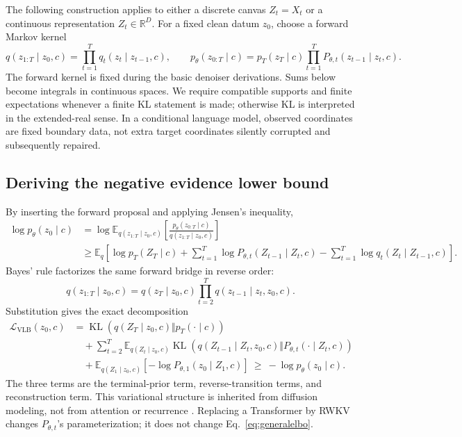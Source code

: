 \documentclass{article}
\theoremstyle{remark}\newtheorem{remark}[theorem]{Remark}
\newcommand{\R}{\mathbb R}
\newcommand{\E}{\mathbb E}
\newcommand{\KL}{\operatorname{KL}}
\begin{document}
The following construction applies to either a discrete canvas $Z_t=X_t$ or a continuous representation $Z_t\in\R^D$. For a fixed clean datum $z_0$, choose a forward Markov kernel
\begin{equation}
 q(z_{1:T}\mid z_0,c)=\prod_{t=1}^T q_t(z_t\mid z_{t-1},c),
 \qquad
 p_\theta(z_{0:T}\mid c)=p_T(z_T\mid c)\prod_{t=1}^T P_{\theta,t}(z_{t-1}\mid z_t,c).
 \label{eq:commonpath}
\end{equation}
The forward kernel is fixed during the basic denoiser derivations. Sums below become integrals in continuous spaces. We require compatible supports and finite expectations whenever a finite KL statement is made; otherwise KL is interpreted in the extended-real sense. In a conditional language model, observed coordinates are fixed boundary data, not extra target coordinates silently corrupted and subsequently repaired.

\subsection{Deriving the negative evidence lower bound}
By inserting the forward proposal and applying Jensen's inequality,
\begin{align}
 \log p_\theta(z_0\mid c)
 &=\log\E_{q(z_{1:T}\mid z_0,c)}
 \left[\frac{p_\theta(z_{0:T}\mid c)}{q(z_{1:T}\mid z_0,c)}\right]\\
 &\ge\E_q\left[\log p_T(Z_T\mid c)+\sum_{t=1}^T\log P_{\theta,t}(Z_{t-1}\mid Z_t,c)
 -\sum_{t=1}^T\log q_t(Z_t\mid Z_{t-1},c)\right].
\end{align}
Bayes' rule factorizes the same forward bridge in reverse order:
\begin{equation}
 q(z_{1:T}\mid z_0,c)
 =q(z_T\mid z_0,c)\prod_{t=2}^Tq(z_{t-1}\mid z_t,z_0,c).
\end{equation}
Substitution gives the exact decomposition
\begin{align}
 \mathcal L_{\mathrm{VLB}}(z_0,c)
 &=\KL(q(Z_T\mid z_0,c)\Vert p_T(\cdot\mid c))\nonumber\\
 &\quad+\sum_{t=2}^T\E_{q(Z_t\mid z_0,c)}
 \KL\!\left(q(Z_{t-1}\mid Z_t,z_0,c)\Vert P_{\theta,t}(\cdot\mid Z_t,c)\right)\nonumber\\
 &\quad+\E_{q(Z_1\mid z_0,c)}[-\log P_{\theta,1}(z_0\mid Z_1,c)]
 \ \ge\ -\log p_\theta(z_0\mid c).
 \label{eq:generalelbo}
\end{align}
The three terms are the terminal-prior term, reverse-transition terms, and reconstruction term. This variational structure is inherited from diffusion modeling, not from attention or recurrence \cite{sohl,ddpm,d3pm}. Replacing a Transformer by RWKV changes $P_{\theta,t}$'s parameterization; it does not change Eq.~\eqref{eq:generalelbo}.
\end{document}
